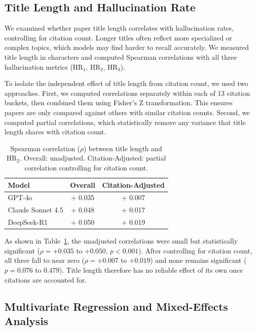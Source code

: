 \documentclass[11pt]{article}
\begin{document}
\subsection{Title Length and Hallucination Rate
\label{sec:title_length}}

We examined whether paper title length correlates with hallucination rates, controlling for citation count. Longer titles often reflect more specialized or complex topics, which models may find harder to recall accurately. We measured title length in characters and computed Spearman correlations with all three hallucination metrics (HR$_1$, HR$_2$, HR$_3$).

To isolate the independent effect of title length from citation count, we used two approaches. First, we computed correlations separately within each of 13 citation buckets, then combined them using Fisher's Z transformation. This ensures papers are only compared against others with similar citation counts. Second, we computed partial correlations, which statistically remove any variance that title length shares with citation count.

\begin{table}[htbp]
\centering
\small

\begin{tabular}{lcc}
\toprule
\textbf{Model} & \textbf{Overall} & \textbf{Citation-Adjusted} \\
\midrule
GPT-4o            & + 0.035 &+ 0.007  \\
Claude Sonnet 4.5 & + 0.048 & + 0.017 \\
DeepSeek-R1       & + 0.050 & + 0.019 \\
\bottomrule
\end{tabular}
\caption{Spearman correlation ($\rho$) between title length and HR$_2$. Overall: unadjusted. Citation-Adjusted: partial correlation controlling for citation count.}
\label{tab:title_length}
\end{table}

As shown in Table~\ref{tab:title_length}, the unadjusted correlations were small but statistically significant ($\rho = +0.035$ to $+0.050$, $p < 0.001$). After controlling for citation count, all three fall to near zero ($\rho = +0.007$ to $+0.019$) and none remains significant ($p = 0.076$ to $0.479$). Title length therefore has no reliable effect of its own once citations are accounted for.

\subsection{Multivariate Regression and Mixed-Effects Analysis}
\label{sec:regression}
\end{document}
